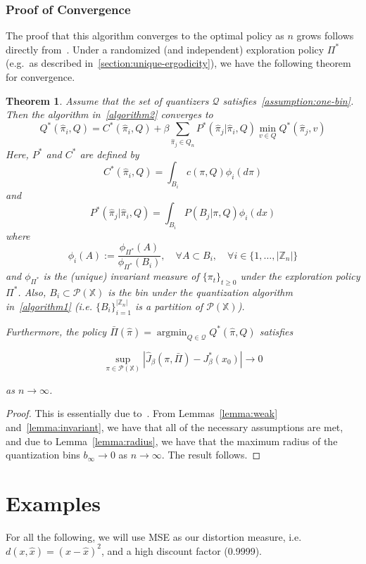 \documentclass{article}
\newtheorem{theorem}{Theorem}[section]
\DeclareMathOperator*{\argmin}{argmin}
\begin{document}
\subsubsection{Proof of Convergence}
The proof that this algorithm converges to the optimal policy as \(n\) grows follows directly from~\cite[Theorem 3.2]{Kara}. Under a randomized (and independent) exploration policy \( \Pi^* \) (e.g.\ as described in~\ref{section:unique-ergodicity}), we have the following theorem for convergence.

\begin{theorem}
    Assume that the set of quantizers \( \mathcal{Q} \) satisfies~\ref{assumption:one-bin}. Then the algorithm in~\ref{algorithm2} converges to
    \[ Q^*(\hat{\pi}_i, Q) = C^*(\hat{\pi}_i, Q) + \beta \sum_{\hat{\pi}_j \in Q_n}P^*(\hat{\pi}_j|\hat{\pi}_i,Q)\min_{v \in Q}Q^*(\hat{\pi}_j, v) \]
    Here, \(P^*\) and \(C^*\) are defined by
    \[ C^*(\hat{\pi}_i, Q) = \int_{B_i}c(\pi,Q)\phi_i(d \pi)\]
    and
    \[ P^*(\hat{\pi}_j|\hat{\pi}_i,Q) = \int_{B_i}P(B_j|\pi,Q)\phi_i(dx) \]
    where
    \[ \phi_i(A) := \frac{\phi_{\Pi^*}(A)}{\phi_{\Pi^*}(B_i)},\quad \forall A \subset B_i, \quad \forall i \in \{ 1,\ldots,|\mathbb{Z}_n| \} \]
    and \( \phi_{\Pi^*} \) is the (unique) invariant measure of \( \{\pi_t\}_{t\ge0} \) under the exploration policy \( \Pi^* \).
    Also, \( B_i \subset \mathcal{P}(\mathbb{X}) \) is the bin under the quantization algorithm in~\ref{algorithm1} (i.e. \( \{B_i\}_{i=1}^{|\mathbb{Z}_n|} \) is a partition of \( \mathcal{P}(\mathbb{X}) \)).

    Furthermore, the policy \( \bar{\Pi}(\hat{\pi}) = \argmin_{Q \in \mathcal{Q}} Q^*(\hat{\pi},Q) \) satisfies

    \[ \sup_{\pi \in \mathcal{P}(\mathbb{X})}|\hat{J}_{\beta}(\pi, \bar{\Pi}) - J_{\beta}^*(x_0)| \to 0 \]

    as \( n \to \infty \).
\end{theorem}

\begin{proof}
    This is essentially due to~\cite[Theorem 3.2 and Corollary 3.3]{Kara}. From Lemmas~\ref{lemma:weak} and~\ref{lemma:invariant}, we have that all of the necessary assumptions are met, and due to Lemma~\ref{lemma:radius}, we have that the maximum radius of the quantization bins \( b_{\infty} \to 0 \) as \( n \to \infty \). The result follows.
\end{proof}

\section{Examples}
For all the following, we will use MSE as our distortion measure, i.e. \( d(x,\hat{x}) = (x - \hat{x})^2 \), and a high discount factor (0.9999).
\end{document}
